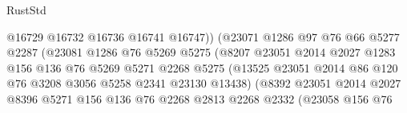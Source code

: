 \begin{lexlean}{RustStd}
\begin{coremodule}
{\begin{coremodule}
{{{{{{{{{{{{{{{{{{{{{{{{{{{{{{{{{{{{{{{{{{{{{{{{{{{{{{                                      @16729
                                      @16732
                                      @16736
                                      @16741
                                      @16747))
                                  (@23071
                                    @1286
                                    @97
                                    @76
                                    @66
                                    @5277
                                    @2287
                                    (@23081
                                      @1286
                                      @76
                                      @5269
                                      @5275
                                      (@8207
                                        @23051
                                        @2014
                                        @2027
                                        @1283
                                        @156
                                        @136
                                        @76
                                        @5269
                                        @5271
                                        @2268
                                        @5275
                                        (@13525
                                          @23051
                                          @2014
                                          @86
                                          @120
                                          @76
                                          @3208
                                          @3056
                                          @5258
                                          @2341
                                          @23130
                                          @13438)
                                        (@8392
                                          @23051
                                          @2014
                                          @2027
                                          @8396
                                          @5271
                                          @156
                                          @136
                                          @76
                                          @2268
                                          @2813
                                          @2268
                                          @2332
                                          (@23058
                                            @156
                                            @76
}}}}}}}}}}}}}}}}}}}}}}}}}}}}}}}}}}}}}}}}}}}}}}}}}}}}}}
\end{coremodule}}
\end{coremodule}
\end{lexlean}
